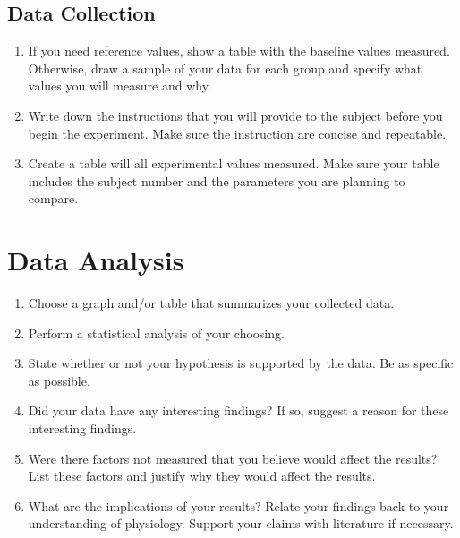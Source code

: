 \documentclass{article}
\begin{document}
\subsection*{Data Collection}
\begin{enumerate}
	\item If you need reference values, show a table with the baseline values measured. Otherwise, draw a sample of your data for each group and specify what values you will measure and why.\vspace{7cm}
	\item Write down the instructions that you will provide to the subject before you begin the experiment. Make sure the instruction are concise and repeatable.\pagebreak
	\item Create a table will all experimental values measured. Make sure your table includes the subject number and the parameters you are planning to compare.\pagebreak
\end{enumerate}

\section*{Data Analysis}
\begin{enumerate}
	\item Choose a graph and/or table that summarizes your collected data.\pagebreak
	\item Perform a statistical analysis of your choosing.\vspace{15cm}
	\item State whether or not your hypothesis is supported by the data. Be as specific as possible.\pagebreak
	\item Did your data have any interesting findings? If so, suggest a reason for these interesting findings.\vspace{5cm}
	\item Were there factors not measured that you believe would affect the results? List these factors and justify why they would affect the results.\vspace{5cm}
	\item What are the implications of your results? Relate your findings back to your understanding of physiology. Support your claims with literature if necessary.
\end{enumerate}
\end{document}

